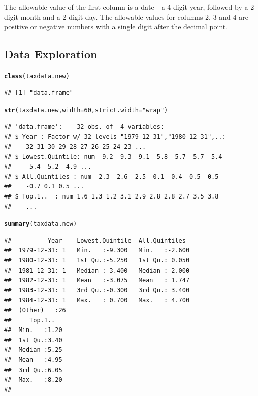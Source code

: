 \documentclass{article}\usepackage[]{graphicx}\usepackage[]{color}
\makeatletter
\newcommand{\hlnum}[1]{\textcolor[rgb]{0.686,0.059,0.569}{#1}}%
\newcommand{\hlstr}[1]{\textcolor[rgb]{0.192,0.494,0.8}{#1}}%
\newcommand{\hlstd}[1]{\textcolor[rgb]{0.345,0.345,0.345}{#1}}%
\newcommand{\hlkwc}[1]{\textcolor[rgb]{0.333,0.667,0.333}{#1}}%
\newcommand{\hlkwd}[1]{\textcolor[rgb]{0.737,0.353,0.396}{\textbf{#1}}}%
\newenvironment{kframe}{%
 \def\at@end@of@kframe{}%
 \ifinner\ifhmode%
  \def\at@end@of@kframe{\end{minipage}}%
  \begin{minipage}{\columnwidth}%
 \fi\fi%
 \def\FrameCommand##1{\hskip\@totalleftmargin \hskip-\fboxsep
 \colorbox{shadecolor}{##1}\hskip-\fboxsep
     \hskip-\linewidth \hskip-\@totalleftmargin \hskip\columnwidth}%
 \MakeFramed {\advance\hsize-\width
   \@totalleftmargin\z@ \linewidth\hsize
   \@setminipage}}%
 {\par\unskip\endMakeFramed%
 \at@end@of@kframe}
\newenvironment{knitrout}{}{} %
\makeatother
\begin{document}
The allowable value of the first column is a date - a 4 digit year, followed by a 2 digit month and a 2 digit day. The allowable values for columns 2, 3 and 4 are positive or negative numbers with a single digit after the decimal point.

\subsection{Data Exploration}


\begin{knitrout}
\color{fgcolor}\begin{kframe}
\begin{alltt}
\hlkwd{class}\hlstd{(taxdata.new)}
\end{alltt}
\begin{verbatim}
## [1] "data.frame"
\end{verbatim}
\begin{alltt}
\hlkwd{str}\hlstd{(taxdata.new,} \hlkwc{width} \hlstd{=} \hlnum{60}\hlstd{,} \hlkwc{strict.width} \hlstd{=} \hlstr{"wrap"}\hlstd{)}
\end{alltt}
\begin{verbatim}
## 'data.frame':	32 obs. of  4 variables:
## $ Year : Factor w/ 32 levels "1979-12-31","1980-12-31",..:
##    32 31 30 29 28 27 26 25 24 23 ...
## $ Lowest.Quintile: num -9.2 -9.3 -9.1 -5.8 -5.7 -5.7 -5.4
##    -5.4 -5.2 -4.9 ...
## $ All.Quintiles : num -2.3 -2.6 -2.5 -0.1 -0.4 -0.5 -0.5
##    -0.7 0.1 0.5 ...
## $ Top.1..  : num 1.6 1.3 1.2 3.1 2.9 2.8 2.8 2.7 3.5 3.8
##    ...
\end{verbatim}
\begin{alltt}
\hlkwd{summary}\hlstd{(taxdata.new)}
\end{alltt}
\begin{verbatim}
##          Year    Lowest.Quintile  All.Quintiles   
##  1979-12-31: 1   Min.   :-9.300   Min.   :-2.600  
##  1980-12-31: 1   1st Qu.:-5.250   1st Qu.: 0.050  
##  1981-12-31: 1   Median :-3.400   Median : 2.000  
##  1982-12-31: 1   Mean   :-3.075   Mean   : 1.747  
##  1983-12-31: 1   3rd Qu.:-0.300   3rd Qu.: 3.400  
##  1984-12-31: 1   Max.   : 0.700   Max.   : 4.700  
##  (Other)   :26                                    
##     Top.1..    
##  Min.   :1.20  
##  1st Qu.:3.40  
##  Median :5.25  
##  Mean   :4.95  
##  3rd Qu.:6.05  
##  Max.   :8.20  
## 
\end{verbatim}
\end{kframe}
\end{knitrout}
\end{document}
